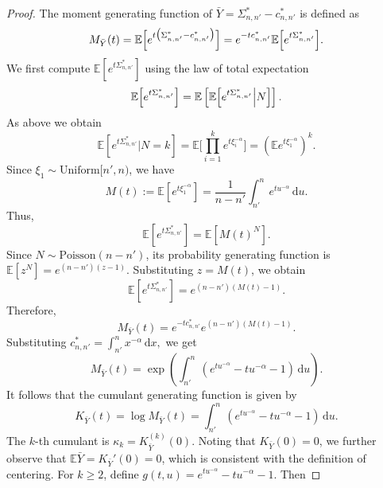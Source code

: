 \documentclass[11pt,twoside,a4paper,reqno]{amsart}
\renewcommand{\d}{\, \text{d}}
\begin{document}
\begin{proof}
The moment generating function of $\bar{Y}=\Sigma^*_{n,n'}-c^*_{n,n'}$ is defined as
\begin{equation*}
M_{\bar{Y}}(t) = \mathbb{E}\Bigl[e^{t\bigl(\Sigma^*_{n,n'}-c^*_{n,n'}\bigr)}\Bigr]=e^{-t c^*_{n,n'}}\mathbb{E}\Bigl[e^{t \Sigma^*_{n,n'}}\Bigr].
\end{equation*}
We first compute $\mathbb{E}[e^{t \Sigma^*_{n,n'}}]$ using the law of total expectation
\begin{equation*}
\mathbb{E}\Bigl[e^{t \Sigma^*_{n,n'}}\Bigr] = \mathbb{E}\left[\mathbb{E}\Bigl[e^{t \Sigma^*_{n,n'}}\Big| N\Bigr]\right].
\end{equation*}
As above we obtain
\begin{equation*}
\mathbb{E}\left[e^{t \Sigma^*_{n,n'}} \Big| N=k\right] = \mathbb{E}\biggl[\prod_{i=1}^k e^{t \xi_i^{-\alpha}}\biggr] =
\left(\mathbb{E}e^{t \xi_1^{-\alpha}} \right)^k.
\end{equation*}
Since $\xi_1\sim \text{Uniform}[n', n)$, we have
\begin{equation*}
M(t):=\mathbb{E}[e^{t \xi_1^{-\alpha}}]=\frac{1}{n-n'} \int_{n'}^{n} e^{t u^{-\alpha}} \d u.
\end{equation*}
Thus,
\begin{equation*}
\mathbb{E}\left[e^{t \Sigma_{n,n'}^*}\right]=\mathbb{E}\left[M(t)^N\right].
\end{equation*}
Since $N\sim \text{Poisson}(n-n')$, its probability generating function is $\mathbb{E}[z^N] = e^{(n-n')(z-1)}$. Substituting $z= M(t)$, we obtain
\begin{equation*}
\mathbb{E}\left[e^{t \Sigma^*_{n,n'}}\right]=e^{(n-n')(M(t)-1)}.
\end{equation*}
Therefore,
\begin{equation*}
M_{\bar{Y}}(t)= e^{-t c^*_{n,n'}} e^{(n-n')(M(t)-1)}.
\end{equation*}
Substituting $c^*_{n,n'}=\int_{n'}^{n} x^{-\alpha} \d x,$ we get
\begin{equation*}
M_{\bar{Y}}(t)=\exp\left(\int_{n'}^{n} \left( e^{t u^{-\alpha}}-t u^{-\alpha}-1\right)\d u\right).
\end{equation*}
It follows that the cumulant generating function is given by
\begin{equation*}
K_{\bar{Y}}(t) =\log M_{\bar{Y}}(t)= \int_{n'}^{n} \left( e^{t u^{-\alpha}}-t u^{-\alpha}-1 \right)\d u.
\end{equation*}
The $k$-th cumulant is $\kappa_k = K_{\bar{Y}}^{(k)}(0)$. Noting that $K_{\bar{Y}}(0) = 0$, we further observe that $\mathbb{E}\bar{Y}= K_{\bar{Y}}'(0) = 0$, which is consistent with the definition of centering. For $k \geq 2$, define $g(t, u) = e^{t u^{-\alpha}}-t u^{-\alpha}-1$. Then

\end{proof}
\end{document}
